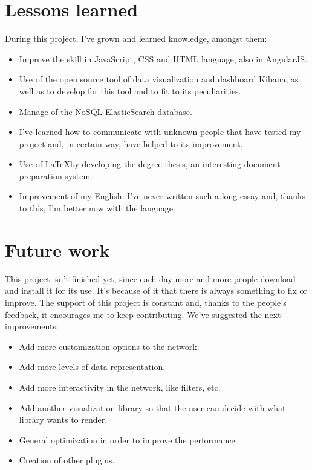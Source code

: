 \documentclass[a4paper, 12pt]{book}
\begin{document}
\section{Lessons learned}
\label{sec:ll}

During this project, I’ve grown and learned knowledge, amongst them:

\begin{itemize}
\item Improve the skill in JavaScript, CSS and HTML language, also in AngularJS.
\item Use of the open source tool of data visualization and dashboard Kibana, as well as to develop for this tool and to fit to its peculiarities.
\item Manage of the NoSQL ElasticSearch database.
\item I’ve learned how to communicate with unknown people that have tested my project and, in certain way, have helped to its improvement.
\item Use of \LaTeX by developing the degree thesis, an interesting document preparation system.
\item Improvement of my English.  I’ve never written such a long essay and, thanks to this, I’m better now with the language.
\end{itemize}

\section{Future work}
\label{sec:fw}

This project isn’t finished yet, since each day more and more people download and install it for its use. It’s because of it that there is always something to fix or improve. The support of this project is constant and, thanks to the people’s feedback, it encourages me to keep contributing. We’ve suggested the next improvements:

\begin{itemize}
\item Add more customization options to the network.
\item Add more levels of data representation.
\item Add more interactivity in the network, like filters, etc.
\item Add another visualization library so that the user can decide with what library wants to render.
\item General optimization in order to improve the performance.
\item Creation of other plugins.
\end{itemize}
\end{document}
